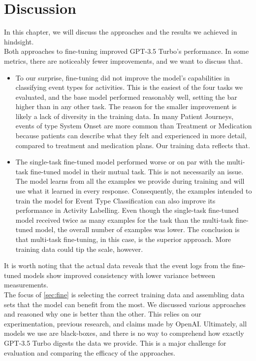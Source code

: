 \section{Discussion}\label{sec:discussion}
In this chapter, we will discuss the approaches and the results we achieved in hindsight.\\
Both approaches to fine-tuning improved GPT-3.5 Turbo's performance. In some metrics, there are noticeably fewer improvements, and we want to discuss that.\\
\begin{itemize}[partopsep=0pt, topsep=0pt]
    \item To our surprise, fine-tuning did not improve the model's capabilities in classifying event types for activities. This is the easiest of the four tasks we evaluated, and the base model performed reasonably well, setting the bar higher than in any other task. The reason for the smaller improvement is likely a lack of diversity in the training data. In many Patient Journeys, events of type System Onset are more common than Treatment or Medication because patients can describe what they felt and experienced in more detail, compared to treatment and medication plans. Our training data reflects that.
    \item The single-task fine-tuned model performed worse or on par with the multi-task fine-tuned model in their mutual task. This is not necessarily an issue. The model learns from all the examples we provide during training and will use what it learned in every response. Consequently, the examples intended to train the model for Event Type Classification can also improve its performance in Activity Labelling. Even though the single-task fine-tuned model received twice as many examples for the task  than the multi-task fine-tuned model, the overall number of examples was lower. The conclusion is that multi-task fine-tuning, in this case, is the superior approach. More training data could tip the scale, however.
\end{itemize}
It is worth noting that the actual data reveals that the event logs from the fine-tuned models show improved consistency with lower variance between measurements.\\
The focus of \autoref{sec:fine} is selecting the correct training data and assembling data sets that the model can benefit from the most. We discussed various approaches and reasoned why one is better than the other. This relies on our experimentation, previous research, and claims made by OpenAI. Ultimately, all models we use are black-boxes, and there is no way to comprehend how exactly GPT-3.5 Turbo digests the data we provide. This is a major challenge for evaluation and comparing the efficacy of the approaches.